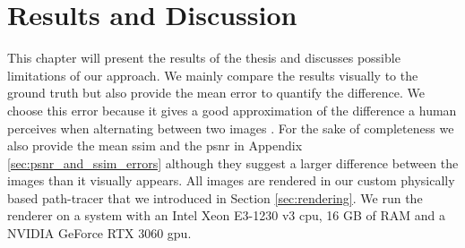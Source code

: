\chapter{Results and Discussion}
\label{chap:results_and_discussion}
This chapter will present the results of the thesis and discusses possible limitations of our approach.
We mainly compare the results visually to the ground truth but also provide the mean \FLIP \cite{flip} error to quantify the difference.
We choose this error because it gives a good approximation of the difference a human perceives when alternating between two images \cite{flip}.
For the sake of completeness we also provide the mean \ac{ssim} and the \ac{psnr} in Appendix \ref{sec:psnr_and_ssim_errors} although they suggest a larger difference between the images than it visually appears.
All images are rendered in our custom physically based path-tracer that we introduced in Section \ref{sec:rendering}.
We run the renderer on a system with an Intel Xeon E3-1230 v3 \ac{cpu}, 16 GB of RAM and a NVIDIA GeForce RTX 3060 \ac{gpu}.

